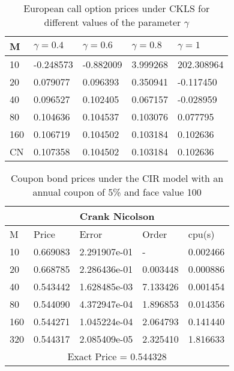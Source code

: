 \documentclass[11pt]{article}
\begin{document}
\begin{table}[htp]
\begin{tabular}{ |p{2cm}|p{3cm}|p{3cm}|p{3cm}|p{3cm}|  }

 \hline
 M & $\gamma = 0.4$ & $\gamma = 0.6$ & $\gamma = 0.8$ & $\gamma = 1$\\
 \hline
10 & -0.248573 & -0.882009 &  3.999268 & 202.308964\\
20 & 0.079077 & 0.096393 & 0.350941 & -0.117450\\
40 & 0.096527 & 0.102405 & 0.067157 & -0.028959\\
80 & 0.104636 & 0.104537 & 0.103076 & 0.077795\\
160 & 0.106719  & 0.104502 & 0.103184 & 0.102636\\

 \hline
 CN & 0.107358 & 0.104502 & 0.103184 & 0.102636\\
 \hline
 
\end{tabular}
\caption{ European call option prices under CKLS for different values of the parameter $\gamma$ }


\end{table}

\begin{table}[htp]
\begin{tabular}{ |p{2cm}|p{3cm}|p{3cm}|p{3cm}|p{3cm}|  }
 \hline
 \multicolumn{5}{|c|}{Crank Nicolson} \\
 \hline
 M & Price & Error & Order & cpu(s)\\
 \hline
10 & 0.669083 & 2.291907e-01 &  - & 0.002466\\
20 & 0.668785 & 2.286436e-01 & 0.003448 & 0.000886\\
40 & 0.543442 & 1.628485e-03 & 7.133426 & 0.001454\\
80 & 0.544090 & 4.372947e-04 & 1.896853 & 0.014356\\
160 & 0.544271 & 1.045224e-04 & 2.064793 & 0.141440\\
320 & 0.544317 & 2.085409e-05 & 2.325410 & 1.816633\\
 \hline
 \multicolumn{5}{|c|}{Exact Price = 0.544328} \\
 \hline
 
\end{tabular}
\caption{ Coupon bond prices under the CIR model with an annual coupon of 5\% and face value 100}

\end{table}
\end{document}
